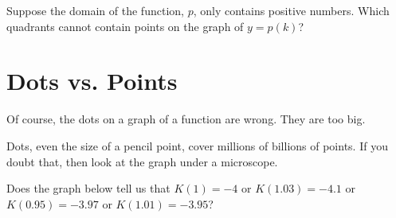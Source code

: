 \documentclass{ximera}
\begin{document}
\begin{question} 


Suppose the domain of the function, $p$, only contains positive numbers.  Which quadrants cannot contain points on the graph of $y=p(k)$?

\begin{selectAll}
\end{selectAll}

\end{question}






























\section*{Dots vs. Points}



Of course, the dots on a graph of a function are wrong. They are too big. 


Dots, even the size of a pencil point, cover millions of billions of points. If you doubt that, then look at the graph under a microscope.

Does the graph below tell us that $K(1) = -4$ or $K(1.03) = -4.1$ or $K(0.95) = -3.97$ or $K(1.01) = -3.95$?

\begin{image}
\end{image}
\end{document}
